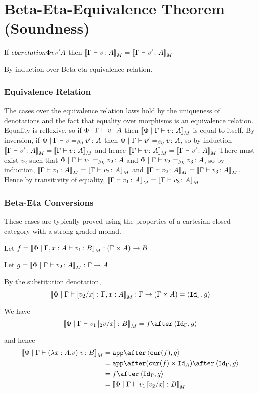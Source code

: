\documentclass{report}
\begin{document}
\chapter{Beta-Eta-Equivalence Theorem (Soundness)}

If $\\eberelation{\P}{v}{v'}{A}$ then $\gdenoequality{v}{v'}{A}$

By induction over Beta-eta equivalence relation.
\subsection{Equivalence Relation}
The cases over the equivalence relation laws hold by the uniqueness of denotations and the fact that equality over morphisms is an equivalence relation.
Equality is reflexive, so if $\gpetyperelation{v}{A}$ then $\deno{\gpetyperelation{v}{A}}$ is equal to itself.
By inversion, if $\gpeberelation{v}{v'}{A}$ then $\gpeberelation{v'}{v}{A}$, so by induction $\gdenoequality{v'}{v}{A}$ and hence $\gdenoequality{v}{v'}{A}$
There must exist $v_2$ such that $\gpeberelation{v_1}{v_2}{A}$ and $\gpeberelation{v_2}{v_3}{A}$, so by induction,
$\gdenoequality{v_1}{v_2}{A}$ and $\gdenoequality{v_2}{v_3}{A}$. Hence by transitivity of equality, $\gdenoequality{v_1}{v_3}{A}$

\subsection{Beta-Eta Conversions}
These cases are typically proved using the properties of a cartesian closed category with a strong graded monad.

    Let $f = \deno{\etyperelation{\P}{\gax}{v_1}{B}}: (\G \times A) \rightarrow B$

    Let $g = \deno{\gpetyperelation{v_2}{A}}: \G \rightarrow A$

    By the substitution denotation, $$\deno{\etyperelation{\P}{\G}{\ssub{x}{v_2}}{\gax}}: \G \rightarrow (\G \times A) = \pr{\idg}{g}$$

    We have $$\deno{\gpetyperelation{v_1\ssub{x}{_2v}}{B}} = f \after \pr{\idg}{g}$$

    and hence
    \begin{equation}
        \begin{split}
            \deno{\gpetyperelation{\apply{(\lam{x}{A}{v})}{v}}{B}} & = \app\after\pr{\cur{f}}{g} \\
            & = \app\after(\cur{f}\times\Id{A})\after\pr{\idg}{g}\\
            & = f \after \pr{\idg}{g} \\
            & = \deno{\gpetyperelation{v_1\ssub{x}{v_2}}{B}}  
        \end{split}
    \end{equation}
   
\end{document}
